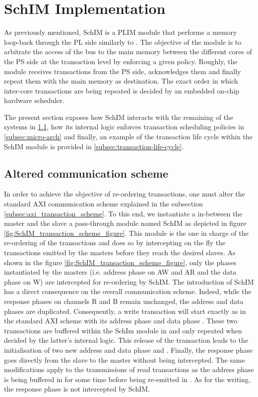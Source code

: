 \section{SchIM Implementation}
    \label{sec:schim_implmentation}
    As previously mentioned, SchIM is a PLIM module that performs a memory loop-back through the PL side similarly to \cite{PLIM20}.
    The objective of the module is to arbitrate the access of the bus to the main memory between the different cores of the PS side at the transaction level by enforcing a given policy.
    Roughly, the module receives transactions from the PS side, acknowledges them and finally repeat them with the main memory as destination.
    The exact order in which inter-core transactions are being repeated is decided by an embedded on-chip hardware scheduler.

    The present section exposes how SchIM interacts with the remaining of the systems in \ref{subsec:communication-scheme}, how its internal logic enforces transaction scheduling policies in \ref{subsec:micro-arch} and finally, an example of the transaction life cycle within the SchIM module is provided in \ref{subsec:transaction-life-cycle}.

    \subsection{Altered communication scheme}
        \label{subsec:communication-scheme}
        In order to achieve the objective of re-ordering transactions, one must alter the standard AXI communication scheme explained in the subsection \ref{subsec:axi_transaction_scheme}.
        To this end, we instantiate a in-between the master and the slave a pass-through module named SchIM as depicted in figure \ref{fig:SchIM_transaction_scheme_figure}.
        This module is the one in charge of the re-ordering of the transactions and does so by intercepting on the fly the transactions emitted by the masters before they reach the desired slaves.
        As shown in the figure \ref{fig:SchIM_transaction_scheme_figure}, only the phases instantiated by the masters (i.e. address phase on AW and AR and the data phase on W) are intercepted for re-ordering by SchIM.
        The introduction of SchIM has a direct consequence on the overall communication scheme. Indeed, while the response phases on channels R and B remain unchanged, the address and data phases are duplicated.
        Consequently, a write transaction will start exactly as in the standard AXI scheme with its address phase  and data phase .
        These two transactions are buffered within the SchIm module in  and only repeated when decided by the latter's internal logic.
        This release of the transaction leads to the initialisation of two new address and data phase  and .
        Finally, the response phase  goes directly from the slave to the master without being intercepted.
        The same modifications apply to the transmissions of read transactions as the address phase  is being buffered in  for some time before being re-emitted in .
        As for the writing, the response phase  is not intercepted by SchIM.

